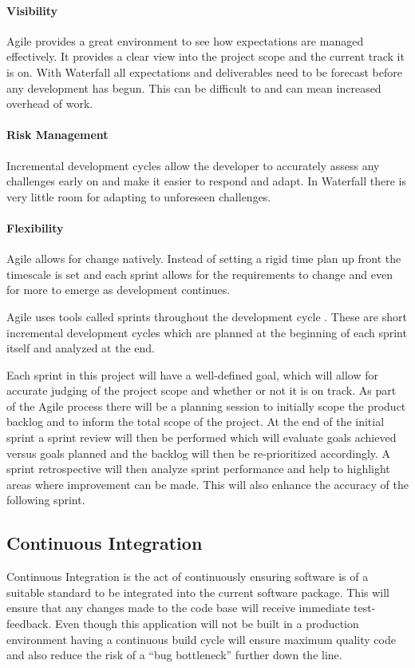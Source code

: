 \documentclass{article}
\begin{document}
\paragraph{Visibility} Agile provides a great environment to see how expectations are managed effectively. It provides a clear view into the project scope and the current track it is on. With Waterfall all expectations and deliverables need to be forecast before any development has begun. This can be difficult to and can mean increased overhead of work.

\paragraph{Risk Management} Incremental development cycles allow the developer to accurately assess any challenges early on and make it easier to respond and adapt. In Waterfall there is very little room for adapting to unforeseen challenges.

\paragraph{Flexibility} Agile allows for change natively. Instead of setting a rigid time plan up front the timescale is set and each sprint allows for the requirements to change and even for more to emerge as development continues.

Agile uses tools called sprints throughout the development cycle \citep{Agile2016}. These are short incremental development cycles which are planned at the beginning of each sprint itself and analyzed at the end.

Each sprint in this project will have a well-defined goal, which will allow for accurate judging of the project scope and whether or not it is on track. As part of the Agile process there will be a planning session to initially scope the product backlog and to inform the total scope of the project. At the end of the initial sprint a sprint review will then be performed which will evaluate goals achieved versus goals planned and the backlog will then be re-prioritized accordingly. A sprint retrospective will then analyze sprint performance and help to highlight areas where improvement can be made. This will also enhance the accuracy of the following sprint.

\subsection{Continuous Integration}
Continuous Integration is the act of continuously ensuring software is of a suitable standard to be integrated into the current software package. This will ensure that any changes made to the code base will receive immediate test-feedback. Even though this application will not be built in a production environment having a continuous build cycle will ensure maximum quality code and also reduce the risk of a ``bug bottleneck'' further down the line.
\end{document}
